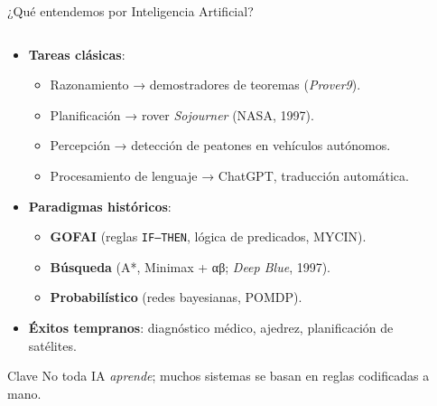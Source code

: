\documentclass[8pt,spanish]{beamer}
\begin{document}
\begin{frame}[fragile]{¿Qué entendemos por Inteligencia Artificial?}

\begin{columns}[T]
\begin{column}{0.55\textwidth}
  \begin{itemize}
    \item \textbf{Tareas clásicas}:  
      \begin{itemize}
        \item \alert{Razonamiento} → demostradores de teoremas (\textit{Prover9}).  
        \item \alert{Planificación} → rover \textit{Sojourner} (NASA, 1997).  
        \item \alert{Percepción} → detección de peatones en vehículos autónomos.  
        \item \alert{Procesamiento de lenguaje} → ChatGPT, traducción automática.  
      \end{itemize}
    \item \textbf{Paradigmas históricos}:
      \begin{itemize}
        \item \textbf{GOFAI} (reglas \texttt{IF–THEN}, lógica de predicados, MYCIN).  
        \item \textbf{Búsqueda} (A*, Minimax + αβ; \textit{Deep Blue}, 1997).  
        \item \textbf{Probabilístico} (redes bayesianas, POMDP).  
      \end{itemize}
    \item \textbf{Éxitos tempranos}: diagnóstico médico, ajedrez, planificación de satélites.  
  \end{itemize}

  \begin{block}{Clave}
    No toda IA \emph{aprende}; muchos sistemas se basan en reglas codificadas a mano.
  \end{block}
\end{column}

\begin{column}{0.45\textwidth}
  \begin{center}


\end{center}
\end{column}
\end{columns}
\end{frame}
\end{document}
